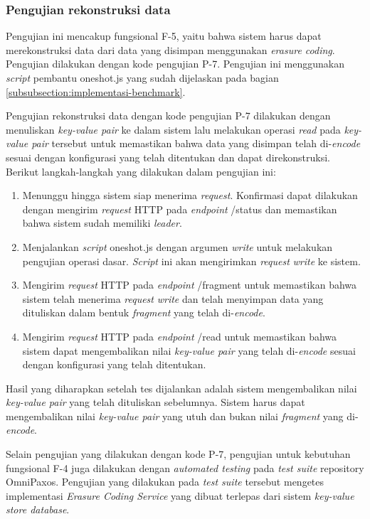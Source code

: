 \subsubsection{Pengujian rekonstruksi data}
\label{subsubsection:pengujian-rekonstruksi-data}

Pengujian ini mencakup fungsional F-5, yaitu bahwa sistem harus dapat merekonstruksi data dari data yang disimpan menggunakan \textit{erasure coding}. Pengujian dilakukan dengan kode pengujian P-7. Pengujian ini menggunakan \textit{script} pembantu oneshot.js yang sudah dijelaskan pada bagian \ref{subsubsection:implementasi-benchmark}. 

Pengujian rekonstruksi data dengan kode pengujian P-7 dilakukan dengan menuliskan \textit{key-value pair} ke dalam sistem lalu melakukan operasi \textit{read} pada \textit{key-value pair} tersebut untuk memastikan bahwa data yang disimpan telah di-\textit{encode} sesuai dengan konfigurasi yang telah ditentukan dan dapat direkonstruksi. Berikut langkah-langkah yang dilakukan dalam pengujian ini:

\begin{enumerate}
  \item Menunggu hingga sistem siap menerima \textit{request}. Konfirmasi dapat dilakukan dengan mengirim \textit{request} HTTP pada \textit{endpoint} /status dan memastikan bahwa sistem sudah memiliki \textit{leader}.
  \item Menjalankan \textit{script} oneshot.js dengan argumen \textit{write} untuk melakukan pengujian operasi dasar. \textit{Script} ini akan mengirimkan \textit{request} \textit{write} ke sistem.
  \item Mengirim \textit{request} HTTP pada \textit{endpoint} /fragment untuk memastikan bahwa sistem telah menerima \textit{request} \textit{write} dan telah menyimpan data yang dituliskan dalam bentuk \textit{fragment} yang telah di-\textit{encode}.
  \item Mengirim \textit{request} HTTP pada \textit{endpoint} /read untuk memastikan bahwa sistem dapat mengembalikan nilai \textit{key-value pair} yang telah di-\textit{encode} sesuai dengan konfigurasi yang telah ditentukan.
\end{enumerate}

Hasil yang diharapkan setelah tes dijalankan adalah sistem mengembalikan nilai \textit{key-value pair} yang telah dituliskan sebelumnya. Sistem harus dapat mengembalikan nilai \textit{key-value pair} yang utuh dan bukan nilai \textit{fragment} yang di-\textit{encode}.

Selain pengujian yang dilakukan dengan kode P-7, pengujian untuk kebutuhan fungsional F-4 juga dilakukan dengan \textit{automated testing} pada \textit{test suite} repository OmniPaxos. Pengujian yang dilakukan pada \textit{test suite} tersebut mengetes implementasi \textit{Erasure Coding Service} yang dibuat terlepas dari sistem \textit{key-value store database}.